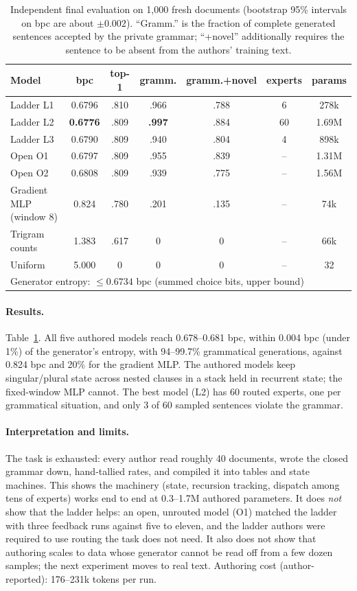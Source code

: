 \documentclass[11pt]{article}
\begin{document}
\begin{table}[t]
\centering\small
\begin{tabular}{lcccccc}
\toprule
Model & bpc & top-1 & gramm. & gramm.+novel & experts & params\\
\midrule
Ladder L1 & 0.6796 & .810 & .966 & .788 & 6 & 278k\\
Ladder L2 & \textbf{0.6776} & .809 & \textbf{.997} & .884 & 60 & 1.69M\\
Ladder L3 & 0.6790 & .809 & .940 & .804 & 4 & 898k\\
Open O1 & 0.6797 & .809 & .955 & .839 & -- & 1.31M\\
Open O2 & 0.6808 & .809 & .939 & .775 & -- & 1.56M\\
\midrule
Gradient MLP (window 8) & 0.824 & .780 & .201 & .135 & -- & 74k\\
Trigram counts & 1.383 & .617 & 0 & 0 & -- & 66k\\
Uniform & 5.000 & 0 & 0 & 0 & -- & 32\\
\midrule
\multicolumn{7}{l}{Generator entropy: $\leq0.6734$ bpc (summed choice bits, upper bound)}\\
\bottomrule
\end{tabular}
\caption{Independent final evaluation on 1{,}000 fresh documents (bootstrap 95\% intervals on bpc are
about $\pm0.002$). ``Gramm.'' is the fraction of complete generated sentences accepted by the
private grammar; ``+novel'' additionally requires the sentence to be absent from the authors' training text.}
\label{tab:exp2}
\end{table}

\paragraph{Results.} Table~\ref{tab:exp2}. All five authored models reach 0.678--0.681 bpc, within
0.004 bpc (under 1\%) of the generator's entropy, with 94--99.7\% grammatical generations, against
0.824 bpc and 20\% for the gradient MLP. The authored models keep singular/plural state across nested
clauses in a stack held in recurrent state; the fixed-window MLP cannot. The best model (L2) has 60
routed experts, one per grammatical situation, and only 3 of 60 sampled sentences violate the grammar.

\paragraph{Interpretation and limits.} The task is exhausted: every author read roughly 40 documents,
wrote the closed grammar down, hand-tallied rates, and compiled it into tables and state machines. This
shows the machinery (state, recursion tracking, dispatch among tens of experts) works end to end at
0.3--1.7M authored parameters. It does \emph{not} show that the ladder helps: an open, unrouted model
(O1) matched the ladder with three feedback runs against five to eleven, and the ladder authors were
required to use routing the task does not need. It also does not show that authoring scales to data
whose generator cannot be read off from a few dozen samples; the next experiment moves to real text.
Authoring cost (author-reported): 176--231k tokens per run.
\end{document}
